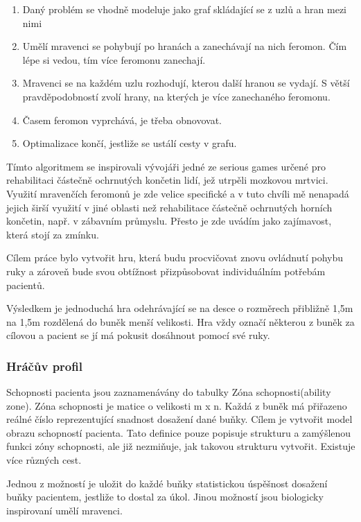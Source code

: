 \begin{enumerate}
	\item Daný problém se vhodně modeluje jako graf skládající se z uzlů a hran mezi nimi
	\item Umělí mravenci se pohybují po hranách a zanechávají na nich feromon. Čím lépe si vedou, tím více feromonu zanechají.
	\item Mravenci se na každém uzlu rozhodují, kterou další hranou se vydají. S větší pravděpodobností zvolí hrany, na kterých je více zanechaného feromonu.
	\item Časem feromon vyprchává, je třeba obnovovat.
	\item Optimalizace končí, jestliže se ustálí cesty v grafu. 
\end{enumerate}

Tímto algoritmem se inspirovali vývojáři jedné ze serious games určené pro rehabilitaci částečně ochrnutých končetin lidí, jež utrpěli mozkovou mrtvici\cite{26poststroke}. Využití mravenčích feromonů je zde velice specifické a v tuto chvíli mě nenapadá jejich širší využití v jiné oblasti než rehabilitace částečně ochrnutých horních končetin, např. v zábavním průmyslu. Přesto je zde uvádím jako zajímavost, která stojí za zmínku.

Cílem práce bylo vytvořit hru, která budu procvičovat znovu ovládnutí pohybu ruky a zároveň bude svou obtížnost přizpůsobovat individuálním potřebám pacientů.

Výsledkem je jednoduchá hra odehrávající se na desce o rozměrech přibližně 1,5m na 1,5m rozdělená do buněk menší velikosti. Hra vždy označí některou z buněk za cílovou a pacient se jí má pokusit dosáhnout pomocí své ruky.

\subsubsection{Hráčův profil}

Schopnosti pacienta jsou zaznamenávány do tabulky Zóna schopnosti(ability zone). Zóna schopnosti je matice o velikosti m x n. Každá z buněk má přiřazeno reálné číslo reprezentující snadnost dosažení dané buňky. Cílem je vytvořit model obrazu schopností pacienta.
Tato definice pouze popisuje strukturu a zamýšlenou funkci zóny schopnosti, ale již nezmiňuje, jak takovou strukturu vytvořit. Existuje více různých cest.

Jednou z možností je uložit do každé buňky statistickou úspěšnost dosažení buňky pacientem, jestliže to dostal za úkol. Jinou možností jsou biologicky inspirovaní umělí mravenci.

